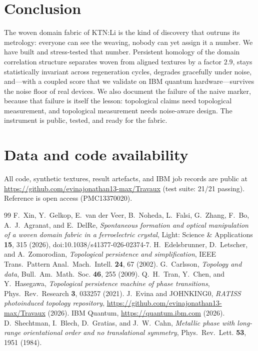 \documentclass[11pt]{article}
\begin{document}
\section{Conclusion}

The woven domain fabric of KTN:Li \cite{Xin2026} is the kind of discovery
that outruns its metrology: everyone can see the weaving, nobody can yet
assign it a number. We have built and stress-tested that number. Persistent
homology of the domain correlation structure separates woven from aligned
textures by a factor $2.9$, stays statistically invariant across
regeneration cycles, degrades gracefully under noise, and---with a coupled
score that we validate on IBM quantum hardware---survives the noise floor of
real devices. We also document the failure of the naive marker, because that
failure is itself the lesson: topological claims need topological
measurement, and topological measurement needs noise-aware design. The
instrument is public, tested, and ready for the fabric.

\section*{Data and code availability}

All code, synthetic textures, result artefacts, and IBM job records are
public at \url{https://github.com/evinajonathan13-max/Travaux} \cite{repo}
(test suite: 21/21 passing). Reference \cite{Xin2026} is open access
(PMC13370020).

\begin{thebibliography}{99}
 F.~Xin, Y.~Gelkop, E.~van der Veer, B.~Noheda, L.~Falsi,
G.~Zhang, F.~Bo, A.~J.~Agranat, and E.~DelRe, \emph{Spontaneous formation
and optical manipulation of a woven domain fabric in a ferroelectric
crystal}, Light: Science \& Applications \textbf{15}, 315 (2026),
doi:10.1038/s41377-026-02374-7.
 H.~Edelsbrunner, D.~Letscher, and A.~Zomorodian,
\emph{Topological persistence and simplification}, IEEE Trans.~Pattern
Anal.~Mach.~Intell. \textbf{24}, 67 (2002).
 G.~Carlsson, \emph{Topology and data},
Bull.~Am.~Math.~Soc. \textbf{46}, 255 (2009).
 Q.~H.~Tran, Y.~Chen, and Y.~Hasegawa,
\emph{Topological persistence machine of phase transitions},
Phys.~Rev.~Research \textbf{3}, 033257 (2021).
 J.~Evina and JOHNKING0, \emph{RATISS photoinduced topology
repository}, \url{https://github.com/evinajonathan13-max/Travaux} (2026).
 IBM Quantum, \url{https://quantum.ibm.com} (2026).
 D.~Shechtman, I.~Blech, D.~Gratias, and
J.~W.~Cahn, \emph{Metallic phase with long-range orientational order and no
translational symmetry}, Phys.~Rev.~Lett. \textbf{53}, 1951 (1984).
\end{thebibliography}
\end{document}
